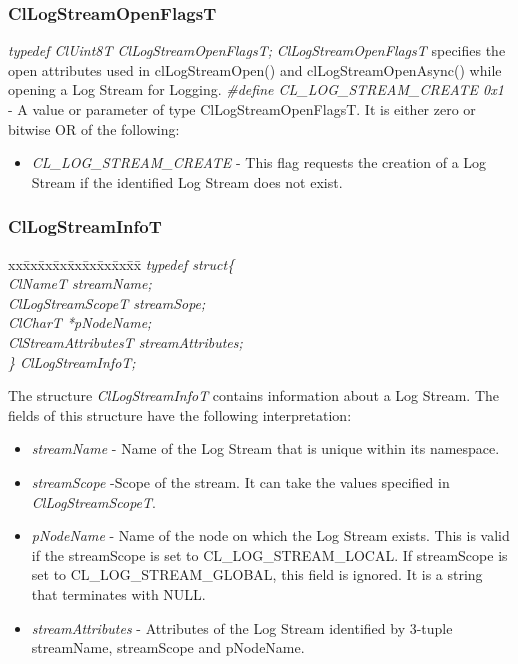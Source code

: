 \begin{flushleft}
\subsubsection{ClLogStreamOpenFlagsT}
\textit{typedef ClUint8T ClLogStreamOpenFlagsT;}
\newline
\newline
\textit{ClLogStreamOpenFlagsT} specifies the open attributes used in clLogStreamOpen() and clLogStreamOpenAsync() while opening a Log Stream for Logging.
\newline 
\newline
\textit{\#define CL\_\-LOG\_\-STREAM\_\-CREATE 0x1} - A value or parameter of type ClLogStreamOpenFlagsT. It is either zero or bitwise OR of the following: 
\begin{itemize}
\item
\textit{CL\_\-LOG\_\-STREAM\_\-CREATE} - This flag requests the creation of a Log Stream if the identified Log Stream does not exist.
\end{itemize}
	


\subsubsection{ClLogStreamInfoT}
\begin{tabbing}
xx\=xx\=xx\=xx\=xx\=xx\=xx\=xx\=xx\=\kill
\textit{typedef struct\{}\\
\>\>\>\>\textit{ClNameT			streamName;}\\
\>\>\>\>\textit{ClLogStreamScopeT		streamSope;}\\
\>\>\>\>\textit{ClCharT			*pNodeName;}\\
\>\>\>\>\textit{ClStreamAttributesT	streamAttributes;}\\
\textit{\} ClLogStreamInfoT;}\end{tabbing}
The structure \textit{ClLogStreamInfoT} contains information about a Log Stream. The fields of this structure have the following interpretation:
\begin{itemize}
\item
\textit{streamName} - Name of the Log Stream that is unique within its namespace.
\item
\textit{streamScope} -Scope of the stream. It can take the values specified in \textit{ClLogStreamScopeT}.
\item
\textit{pNodeName} - Name of the node on which the Log Stream exists. This is valid if the streamScope is set to CL\_\-LOG\_\-STREAM\_\-LOCAL. If 
streamScope is set to CL\_\-LOG\_\-STREAM\_\-GLOBAL, this field is ignored. It is a string that terminates with NULL.
\item
\textit{streamAttributes} - Attributes of the Log Stream identified by 3-tuple streamName, streamScope and pNodeName.
\end{itemize}



\end{flushleft}

